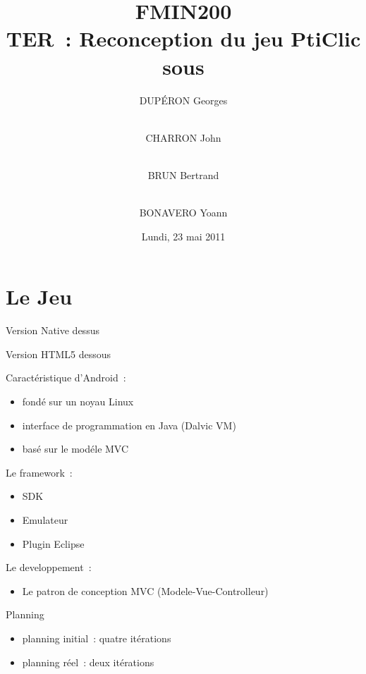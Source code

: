 \documentclass{beamer}
\title{FMIN200 \\ TER~: Reconception du jeu PtiClic sous \android{}}
\author{DUPÉRON Georges \and\\ CHARRON John \and\\ BRUN Bertrand \and\\ BONAVERO Yoann}
\institute{Université Montpellier II, Département informatique}
\date{Lundi, 23 mai 2011}
\def\android{Android\texttrademark}
\begin{document}
\begin{frame}
  \titlepage
\end{frame}

\section{Le Jeu}
\begin{frame}
 \begin{block}{Version Native}
   \centering 
   dessus
 \end{block}
 \begin{block}{Version HTML5}
   \centering 
   dessous
 \end{block}
\end{frame}

\begin{frame}
 Caractéristique d'\android{}~:
  \begin{itemize}
    \item<+-> fondé sur un noyau Linux
    \item<+-> interface de programmation en Java (Dalvic VM)
    \item<+-> basé sur le modéle MVC
  \end{itemize}
\end{frame}

\begin{frame}
  Le framework~:
  \begin{itemize}
    \item<+-> SDK
    \item<+-> Emulateur
    \item<+-> Plugin Eclipse
  \end{itemize}
\end{frame}

\begin{frame}
  Le developpement~:
  \begin{itemize}
    \item<+-> Le patron de conception MVC (Modele-Vue-Controlleur) %
  \end{itemize}
\end{frame}

\begin{frame}
  Planning
  \begin{itemize}
  \item planning initial~: quatre itérations
  \item planning réel~: deux itérations
  \end{itemize}
\end{frame}
\end{document}
